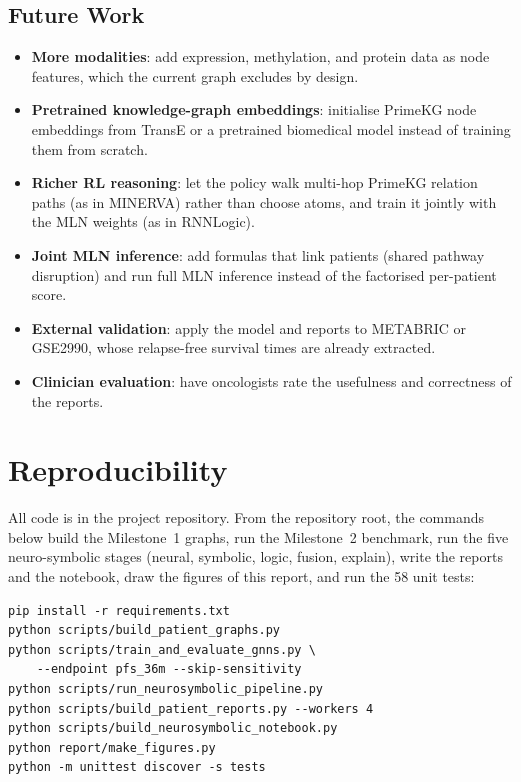 \documentclass{mnnit}
\begin{document}
\section{Future Work}
\begin{itemize}
  \item \textbf{More modalities}: add expression, methylation, and protein data as node features, which the current
        graph excludes by design.
  \item \textbf{Pretrained knowledge-graph embeddings}: initialise PrimeKG node embeddings from TransE or a
        pretrained biomedical model instead of training them from scratch.
  \item \textbf{Richer RL reasoning}: let the policy walk multi-hop PrimeKG relation paths (as in MINERVA) rather than
        choose atoms, and train it jointly with the MLN weights (as in RNNLogic).
  \item \textbf{Joint MLN inference}: add formulas that link patients (shared pathway disruption) and run full MLN
        inference instead of the factorised per-patient score.
  \item \textbf{External validation}: apply the model and reports to METABRIC or GSE2990, whose relapse-free survival
        times are already extracted.
  \item \textbf{Clinician evaluation}: have oncologists rate the usefulness and correctness of the reports.
\end{itemize}

\appendix
\chapter{Reproducibility}

All code is in the project repository. From the repository root, the commands below build the Milestone~1 graphs, run the Milestone~2 benchmark, run the five neuro-symbolic stages (neural, symbolic, logic, fusion, explain), write the reports and the notebook, draw the figures of this report, and run the 58 unit tests:

\begin{verbatim}
pip install -r requirements.txt
python scripts/build_patient_graphs.py
python scripts/train_and_evaluate_gnns.py \
    --endpoint pfs_36m --skip-sensitivity
python scripts/run_neurosymbolic_pipeline.py
python scripts/build_patient_reports.py --workers 4
python scripts/build_neurosymbolic_notebook.py
python report/make_figures.py
python -m unittest discover -s tests
\end{verbatim}
\end{document}
